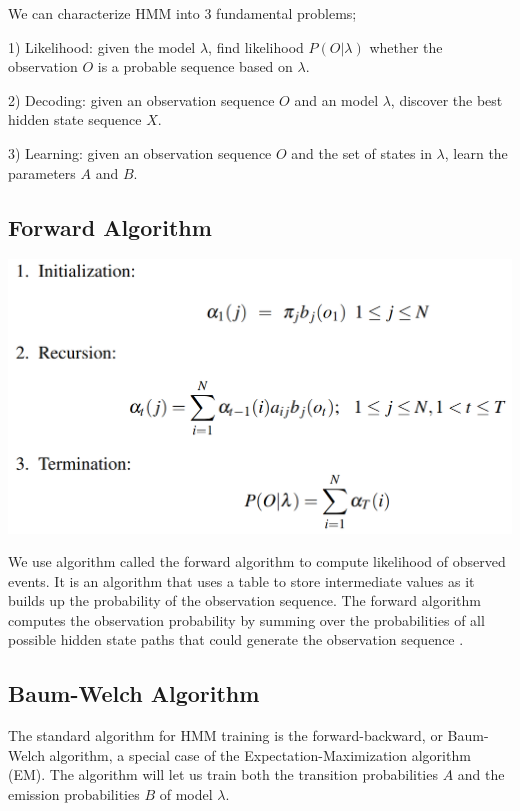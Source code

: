 \documentclass[10pt,twocolumn,letterpaper]{article}
\begin{document}
We can characterize HMM into 3 fundamental problems;

1) Likelihood: given the model $\lambda$, find likelihood $P(O|\lambda)$ whether the observation $O$ is a probable sequence based on $\lambda$.

2) Decoding: given an observation sequence $O$ and an model $\lambda$, discover the best hidden state sequence $X$.

3) Learning: given an observation sequence $O$ and the set of states in $\lambda$, learn the parameters $A$ and $B$.

\subsection{Forward Algorithm}

\begin{center}
\includegraphics[width=1.0\linewidth]{./forward.png}
\end{center}

We use algorithm called the forward algorithm to compute likelihood of observed events. It is an algorithm that uses a table to store intermediate values as it builds up the probability of the observation sequence. The forward algorithm computes the observation probability by summing over the probabilities of all possible hidden state paths that could generate the observation sequence \cite{hmm}.

\subsection{Baum-Welch Algorithm}
The standard algorithm for HMM training is the forward-backward, or Baum-Welch algorithm, a special case of the Expectation-Maximization algorithm (EM). The algorithm will let us train both the transition probabilities $A$ and the emission probabilities $B$ of model $\lambda$.
\end{document}
